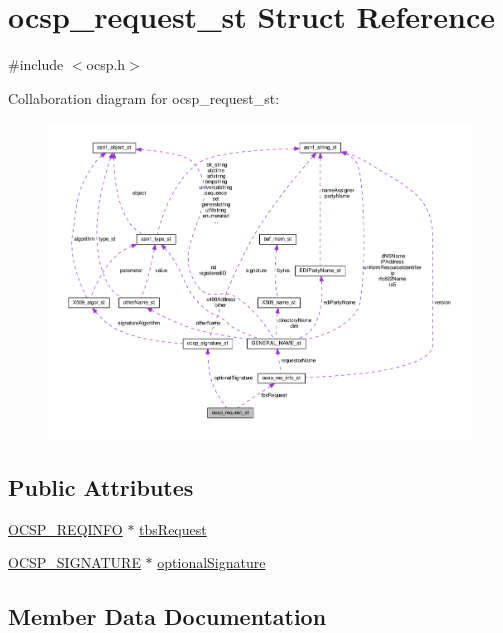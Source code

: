 \hypertarget{structocsp__request__st}{}\section{ocsp\+\_\+request\+\_\+st Struct Reference}
\label{structocsp__request__st}


{\ttfamily \#include $<$ocsp.\+h$>$}



Collaboration diagram for ocsp\+\_\+request\+\_\+st\+:
\nopagebreak
\begin{figure}[H]
\begin{center}
\leavevmode
\includegraphics[width=350pt]{structocsp__request__st__coll__graph}
\end{center}
\end{figure}
\subsection*{Public Attributes}
\begin{DoxyCompactItemize}
\item 
\hyperlink{ocsp_8h_a177b56d87f66e3148989e39382217b32}{O\+C\+S\+P\+\_\+\+R\+E\+Q\+I\+N\+FO} $\ast$ \hyperlink{structocsp__request__st_a743dcc34d9ff06fe9635118c0a0030c0}{tbs\+Request}
\item 
\hyperlink{ocsp_8h_ac3d5728ce7956858c0441c1d8cad917e}{O\+C\+S\+P\+\_\+\+S\+I\+G\+N\+A\+T\+U\+RE} $\ast$ \hyperlink{structocsp__request__st_a97762bfa4b2c09c1811bfe21882fce5a}{optional\+Signature}
\end{DoxyCompactItemize}


\subsection{Member Data Documentation}
